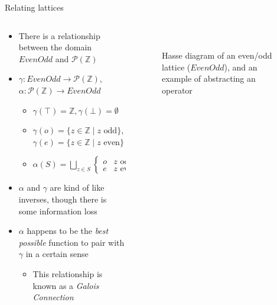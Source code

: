 \documentclass[aspectratio=169,14pt]{beamer}
\begin{document}
\begin{frame}{Relating lattices}
  \begin{columns}
    \begin{column}{0.6\textwidth}
      \small
    \begin{itemize}
    \item There is a relationship between the domain $EvenOdd$ and
      $\mathcal{P}(\mathbb{Z})$
    \item $\gamma : EvenOdd \to \mathcal{P}(\mathbb{Z})$,
      $\alpha : \mathcal{P}(\mathbb{Z}) \to EvenOdd$
      \begin{itemize}
      \item<2-> $\gamma(\top) = \mathbb{Z}, \gamma(\bot) = \emptyset$
      \item<2->
        $\gamma(o) = \{z \in \mathbb{Z} \mid z \text{ odd} \}$,
        $\gamma(e) = \{z \in \mathbb{Z} \mid z \text{ even} \}$
      \item<3-> $\alpha(S) = \bigsqcup\limits_{z \in S}
        \begin{cases}
          o & z \text{ odd}\\
          e & z \text{ even}
        \end{cases}
        $
      \end{itemize}
    \item<5-> $\alpha$ and $\gamma$ are kind of like inverses, though
      there is some information loss
    \item<6-> $\alpha$ happens to be the \emph{best possible} function to pair
      with $\gamma$ in a certain sense
      \begin{itemize}
      \item<7-> This relationship is known as a \emph{Galois Connection}
      \end{itemize}
    \end{itemize}
  \end{column}
  \begin{column}{0.4\textwidth}
    \begin{figure}
      \centering
      
      \vspace{-3cm}
      
      \\[0.5em]

      \caption{Hasse diagram of an even/odd lattice ($EvenOdd$), and
        an example of abstracting an operator}
    \end{figure}
  \end{column}
  \end{columns}
\end{frame}
\end{document}
